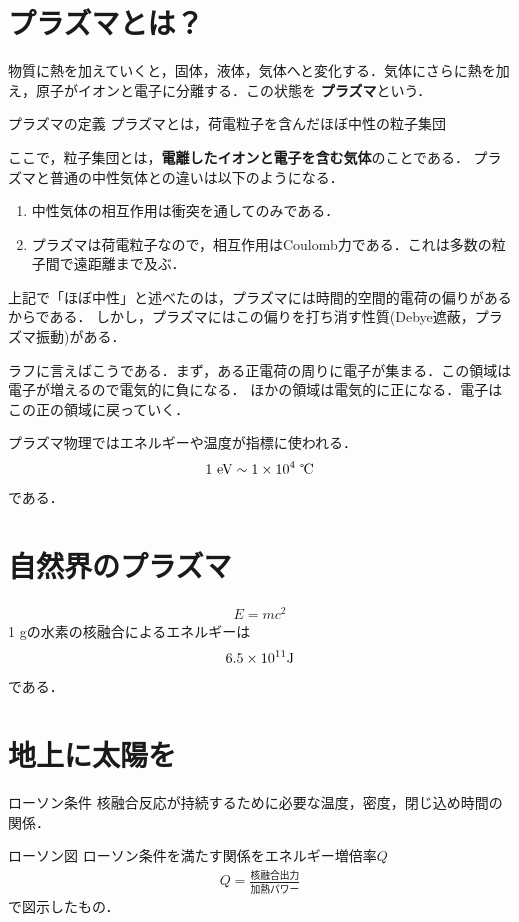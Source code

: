\documentclass{report}
\begin{document}
\section{プラズマとは？}
物質に熱を加えていくと，固体，液体，気体へと変化する．気体にさらに熱を加え，原子がイオンと電子に分離する．この状態を
\textbf{プラズマ}という．
\begin{itembox}[l]{プラズマの定義}
  プラズマとは，荷電粒子を含んだほぼ中性の粒子集団
\end{itembox}
ここで，粒子集団とは，\textbf{電離したイオンと電子を含む気体}のことである．
プラズマと普通の中性気体との違いは以下のようになる．
\begin{enumerate}
  \item 中性気体の相互作用は衝突を通してのみである．
  \item プラズマは荷電粒子なので，相互作用はCoulomb力である．これは多数の粒子間で遠距離まで及ぶ．
\end{enumerate}

上記で「ほぼ中性」と述べたのは，プラズマには時間的空間的電荷の偏りがあるからである．
しかし，プラズマにはこの偏りを打ち消す性質(Debye遮蔽，プラズマ振動)がある．

ラフに言えばこうである．まず，ある正電荷の周りに電子が集まる．この領域は電子が増えるので電気的に負になる．
ほかの領域は電気的に正になる．電子はこの正の領域に戻っていく．

プラズマ物理ではエネルギーや温度が指標に使われる．
\begin{align}
  1\ \mathrm{eV} \sim 1 \times 10^4\ \text{℃}
\end{align}
である．

\section{自然界のプラズマ}
\begin{align}
  E = mc^2
\end{align}
1 gの水素の核融合によるエネルギーは
\begin{align}
  6.5 \times 10^{11} \mathrm{J}
\end{align}
である．

\section{地上に太陽を}
\begin{itembox}[l]{ローソン条件}
  核融合反応が持続するために必要な温度，密度，閉じ込め時間の関係．  
\end{itembox}
\begin{itembox}[l]{ローソン図}
  ローソン条件を満たす関係をエネルギー増倍率$Q$
  \begin{align}
    Q = \frac{\text{核融合出力}}{\text{加熱パワー}}
  \end{align}
  で図示したもの．
\end{itembox}
\end{document}
